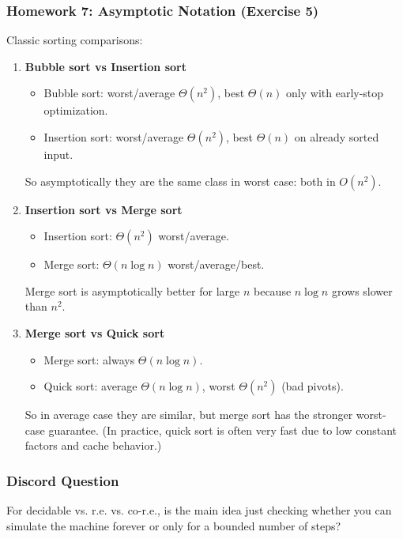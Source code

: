 \documentclass{article}
\theoremstyle{theorem}
\theoremstyle{definition}
\theoremstyle{remark}
\begin{document}
\subsubsection{Homework 7: Asymptotic Notation (Exercise 5)}

Classic sorting comparisons:

\begin{enumerate}
  \item \textbf{Bubble sort vs Insertion sort}
  \begin{itemize}
    \item Bubble sort: worst/average $\Theta(n^2)$, best $\Theta(n)$ only with early-stop optimization.
    \item Insertion sort: worst/average $\Theta(n^2)$, best $\Theta(n)$ on already sorted input.
  \end{itemize}
  So asymptotically they are the same class in worst case: both in $O(n^2)$.

  \item \textbf{Insertion sort vs Merge sort}
  \begin{itemize}
    \item Insertion sort: $\Theta(n^2)$ worst/average.
    \item Merge sort: $\Theta(n\log n)$ worst/average/best.
  \end{itemize}
  Merge sort is asymptotically better for large $n$ because $n\log n$ grows slower than $n^2$.

  \item \textbf{Merge sort vs Quick sort}
  \begin{itemize}
    \item Merge sort: always $\Theta(n\log n)$.
    \item Quick sort: average $\Theta(n\log n)$, worst $\Theta(n^2)$ (bad pivots).
  \end{itemize}
  So in average case they are similar, but merge sort has the stronger worst-case guarantee.
  (In practice, quick sort is often very fast due to low constant factors and cache behavior.)
\end{enumerate}

\subsubsection{Discord Question}

For decidable vs. r.e. vs. co-r.e., is the main idea just checking whether you can simulate the machine forever or only for a bounded number of steps?
\end{document}
